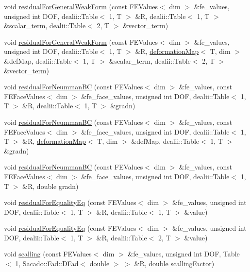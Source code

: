 \begin{DoxyCompactItemize}
\item 
void \hyperlink{class_residual_ab90bb5476a96c0e7098264562b313b7b}{residual\-For\-General\-Weak\-Form} (const F\-E\-Values$<$ dim $>$ \&fe\-\_\-values, unsigned int D\-O\-F, dealii\-::\-Table$<$ 1, T $>$ \&R, dealii\-::\-Table$<$ 1, T $>$ \&scalar\-\_\-term, dealii\-::\-Table$<$ 2, T $>$ \&vector\-\_\-term)
\item 
void \hyperlink{class_residual_a478a5fee7d75f3a16707ad5915a34d3f}{residual\-For\-General\-Weak\-Form} (const F\-E\-Values$<$ dim $>$ \&fe\-\_\-values, unsigned int D\-O\-F, dealii\-::\-Table$<$ 1, T $>$ \&R, \hyperlink{structdeformation_map}{deformation\-Map}$<$ T, dim $>$ \&def\-Map, dealii\-::\-Table$<$ 1, T $>$ \&scalar\-\_\-term, dealii\-::\-Table$<$ 2, T $>$ \&vector\-\_\-term)
\item 
void \hyperlink{class_residual_ad0e81fca1fe14909b80e709c1e93e393}{residual\-For\-Neumman\-B\-C} (const F\-E\-Values$<$ dim $>$ \&fe\-\_\-values, const F\-E\-Face\-Values$<$ dim $>$ \&fe\-\_\-face\-\_\-values, unsigned int D\-O\-F, dealii\-::\-Table$<$ 1, T $>$ \&R, dealii\-::\-Table$<$ 1, T $>$ \&gradn)
\item 
void \hyperlink{class_residual_af2aedfc68848cd35cac392aad840db05}{residual\-For\-Neumman\-B\-C} (const F\-E\-Values$<$ dim $>$ \&fe\-\_\-values, const F\-E\-Face\-Values$<$ dim $>$ \&fe\-\_\-face\-\_\-values, unsigned int D\-O\-F, dealii\-::\-Table$<$ 1, T $>$ \&R, \hyperlink{structdeformation_map}{deformation\-Map}$<$ T, dim $>$ \&def\-Map, dealii\-::\-Table$<$ 1, T $>$ \&gradn)
\item 
void \hyperlink{class_residual_a1e66cf9fc807561fc00cffb93c52d37d}{residual\-For\-Neumman\-B\-C} (const F\-E\-Values$<$ dim $>$ \&fe\-\_\-values, const F\-E\-Face\-Values$<$ dim $>$ \&fe\-\_\-face\-\_\-values, unsigned int D\-O\-F, dealii\-::\-Table$<$ 1, T $>$ \&R, double gradn)
\item 
void \hyperlink{class_residual_a130e92c5dacfaf8cb43adab6aa588eb3}{residual\-For\-Equality\-Eq} (const F\-E\-Values$<$ dim $>$ \&fe\-\_\-values, unsigned int D\-O\-F, dealii\-::\-Table$<$ 1, T $>$ \&R, dealii\-::\-Table$<$ 1, T $>$ \&value)
\item 
void \hyperlink{class_residual_aec6bd7f3e82fa9b13de1dc4074801afd}{residual\-For\-Equality\-Eq} (const F\-E\-Values$<$ dim $>$ \&fe\-\_\-values, unsigned int D\-O\-F, dealii\-::\-Table$<$ 1, T $>$ \&R, dealii\-::\-Table$<$ 2, T $>$ \&value)
\item 
void \hyperlink{class_residual_a339d8e3f5d146ad54951896c5f1e3d19}{scalling} (const F\-E\-Values$<$ dim $>$ \&fe\-\_\-values, unsigned int D\-O\-F, Table$<$ 1, Sacado\-::\-Fad\-::\-D\-Fad$<$ double $>$ $>$ \&R, double scalling\-Factor)

\end{DoxyCompactItemize}

